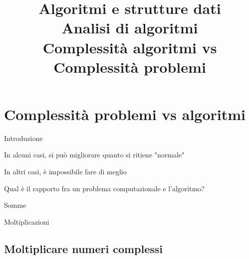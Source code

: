 

\title[ASD - Analisi di algoritmi]{\textbf{Algoritmi e strutture dati}\\[12pt]Analisi di algoritmi\\Complessità algoritmi vs Complessità problemi}

\FrameTitle{}

\section{Complessità problemi vs algoritmi}


\begin{frame}{Introduzione}

\vspace{-9pt}
\begin{myboxtitle}

\BI
\item In alcuni casi, si può migliorare quanto si ritiene "normale"
\item In altri casi, è impossibile fare di meglio
\item Qual è il rapporto fra un problema computazionale e l'algoritmo?
\EI
\end{myboxtitle}

\begin{myboxtitle}
\BI
\item Somme 
\item Moltiplicazioni
\EI
\end{myboxtitle}


\end{frame}

\subsection{Moltiplicare numeri complessi}


